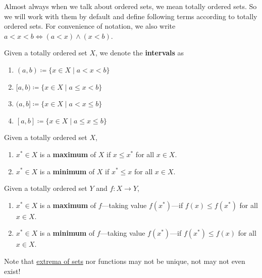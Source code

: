   Almost always when we talk about ordered sets, we mean totally ordered sets. So we will work with them by default and define following terms according to totally ordered sets. For convenience of notation, we also write $a < x < b \iff (a < x) \land (x < b)$. 

  \begin{definition}[Interval]
    \label{def:interval}
    Given a totally ordered set $X$, we denote the \textbf{intervals} as 
    \begin{enumerate}
      \item $(a, b) \coloneqq \{x \in X \mid a < x < b \}$
      \item $[a, b) \coloneqq \{x \in X \mid a \leq x < b \}$
      \item $(a, b] \coloneqq \{x \in X \mid a < x \leq b \}$
      \item $[a, b] \coloneqq \{x \in X \mid a \leq x \leq b \}$
    \end{enumerate}
  \end{definition} 

  \begin{definition}
		\label{def:extrema}
    Given a totally ordered set $X$, 
    \begin{enumerate}
      \item $x^\ast \in X$ is a \textbf{maximum} of $X$ if $x \leq x^\ast$ for all $x \in X$. 
      \item $x^\ast \in X$ is a \textbf{minimum} of $X$ if $x^\ast \leq x$ for all $x \in X$. 
    \end{enumerate}
  \end{definition}

	\begin{definition}
		\label{def:extrema_functions}
	  Given a totally ordered set $Y$ and $f: X \to Y$, 
		\begin{enumerate}
		  \item $x^\ast \in X$ is a \textbf{maximum} of $f$---taking value $f(x^\ast)$---if $f(x) \leq f(x^\ast)$ for all $x \in X$. 
			\item $x^\ast \in X$ is a \textbf{minimum} of $f$---taking value $f(x^\ast)$---if $f(x^\ast) \leq f(x)$ for all $x \in X$. 
		\end{enumerate}
	\end{definition}

	Note that \hyperref[def:extrema]{extrema of sets} nor functions may not be unique, not may not even exist! 

